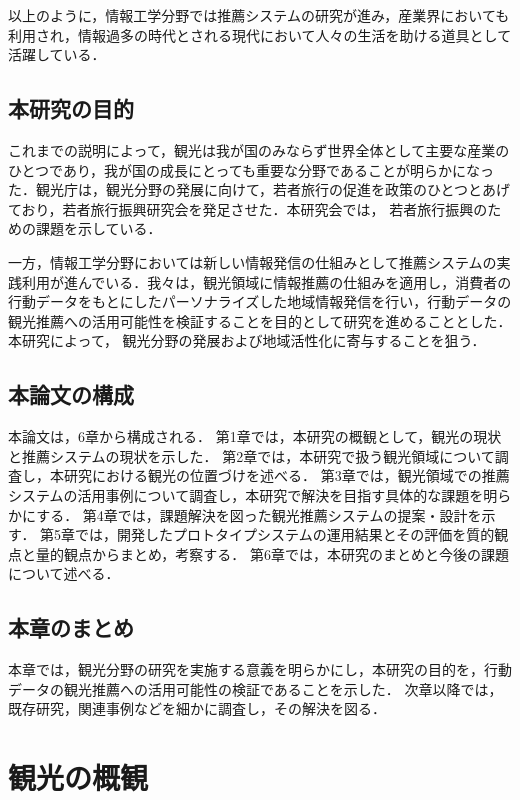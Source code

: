 \documentclass{jsarticle}
\begin{document}
以上のように，情報工学分野では推薦システムの研究が進み，産業界においても利用され，情報過多の時代とされる現代において人々の生活を助ける道具として活躍している．

\subsection{本研究の目的}

これまでの説明によって，観光は我が国のみならず世界全体として主要な産業のひとつであり，我が国の成長にとっても重要な分野であることが明らかになった．観光庁は，観光分野の発展に向けて，若者旅行の促進を政策のひとつとあげており，若者旅行振興研究会を発足させた．本研究会では， 若者旅行振興のための課題を示している．

一方，情報工学分野においては新しい情報発信の仕組みとして推薦システムの実践利用が進んでいる．我々は，観光領域に情報推薦の仕組みを適用し，消費者の行動データをもとにしたパーソナライズした地域情報発信を行い，行動データの観光推薦への活用可能性を検証することを目的として研究を進めることとした．本研究によって， 観光分野の発展および地域活性化に寄与することを狙う．

\subsection{本論文の構成}

本論文は，6章から構成される．
第1章では，本研究の概観として，観光の現状と推薦システムの現状を示した．
第2章では，本研究で扱う観光領域について調査し，本研究における観光の位置づけを述べる．
第3章では，観光領域での推薦システムの活用事例について調査し，本研究で解決を目指す具体的な課題を明らかにする．
第4章では，課題解決を図った観光推薦システムの提案・設計を示す．
第5章では，開発したプロトタイプシステムの運用結果とその評価を質的観点と量的観点からまとめ，考察する．
第6章では，本研究のまとめと今後の課題について述べる．

\subsection{本章のまとめ}

本章では，観光分野の研究を実施する意義を明らかにし，本研究の目的を，行動データの観光推薦への活用可能性の検証であることを示した．
次章以降では，既存研究，関連事例などを細かに調査し，その解決を図る．

\newpage

\section{観光の概観}
\end{document}
